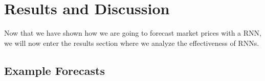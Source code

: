 \documentclass[sigconf]{acmart}
\begin{document}
%
%


\section{Results and Discussion}
\label{sec:results}

Now that we have shown how we are going to forecast market prices with a RNN, we will now enter the results section where we analyze the effectiveness of RNNs. 

\subsection{Example Forecasts}

\end{document}
